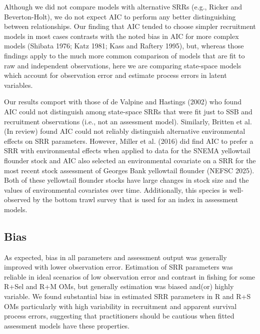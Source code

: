 \documentclass[
  12pt,
]{article}
\begin{document}
Although we did not compare models with alternative SRRs (e.g., Ricker
and Beverton-Holt), we do not expect AIC to perform any better
distinguishing between relationships. Our finding that AIC tended to
choose simpler recruitment models in most cases contrasts with the noted
bias in AIC for more complex models (Shibata 1976; Katz 1981; Kass and
Raftery 1995), but, whereas those findings apply to the much more common
comparison of models that are fit to raw and independent observations,
here we are comparing state-space models which account for observation
error and estimate process errors in latent variables.

Our results comport with those of de Valpine and Hastings (2002) who
found AIC could not distinguish among state-space SRRs that were fit
just to SSB and recruitment observations (i.e., not an assessment
model). Similarly, Britten et al. (In review) found AIC could not
reliably distinguish alternative environmental effects on SRR
parameters. However, Miller et al. (2016) did find AIC to prefer a SRR
with environmental effects when applied to data for the SNEMA yellowtail
flounder stock and AIC also selected an environmental covariate on a SRR
for the most recent stock assessment of Georges Bank yellowtail flounder
(NEFSC 2025). Both of these yellowtail flounder stocks have large
changes in stock size and the values of environmental covariates over
time. Additionally, this species is well-observed by the bottom trawl
survey that is used for an index in assessment models.

\hypertarget{bias-2}{%
\subsection*{Bias}\label{bias-2}}

As expected, bias in all parameters and assessment output was generally
improved with lower observation error. Estimation of SRR parameters was
reliable in ideal scenarios of low observation error and contrast in
fishing for some R+Sel and R+M OMs, but generally estimation was biased
and(or) highly variable. We found substantial bias in estimated SRR
parameters in R and R+S OMs particularly with high variability in
recruitment and apparent survival process errors, suggesting that
practitioners should be cautious when fitted assessment models have
these properties.
\end{document}

